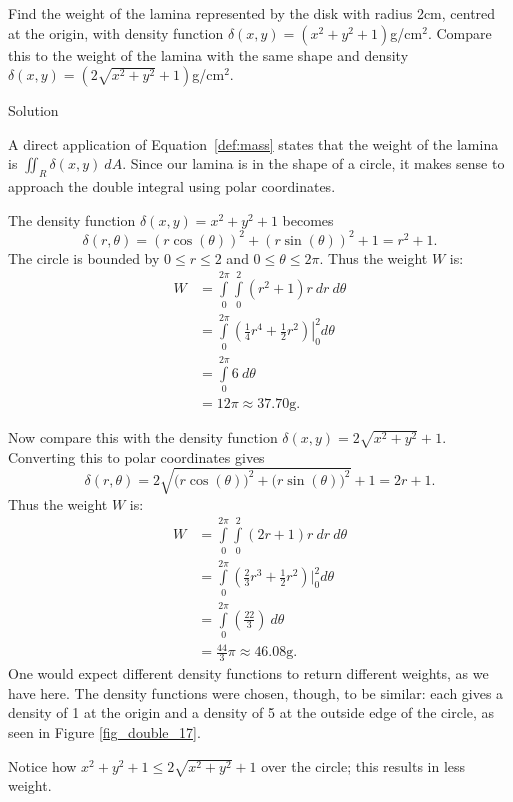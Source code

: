 \begin{example}\label{ex_mass3}
Find the weight of the lamina represented by the disk with radius 2cm, centred at the origin, with density function $\delta(x,y) = (x^2+y^2+1)$g/cm$^2$. Compare this to the weight of the lamina with the same shape and density $\delta(x,y) = (2\sqrt{x^2+y^2}+1)$g/cm$^2$.

Solution 

A direct application of Equation~\eqref{def:mass} states that the weight of the lamina is $\iint_R\delta(x,y)\ dA$. Since our lamina is in the shape of a circle, it makes sense to approach the double integral using polar coordinates.

The density function $\delta(x,y) = x^2+y^2+1$ becomes $$\delta(r,\theta) = (r\cos(\theta))^2+(r\sin(\theta))^2+1 = r^2+1.$$ The circle is bounded by $0\leq r\leq 2$ and $0\leq\theta\leq2\pi$. Thus the weight $W$ is:
\allowdisplaybreaks
\begin{align*}
W &= \int\limits_0^{2\pi}\int\limits_0^2 (r^2+1)r\ dr\ d\theta\\
	&= \int\limits_0^{2\pi} \left.\left(\frac14r^4+\frac12r^2\right)\right|_0^2d\theta\\
	&= \int\limits_0^{2\pi} 6 \ d\theta\\
	&= 12\pi \approx 37.70\text{g}.
\end{align*}

Now compare this with the density function $\delta(x,y) = 2\sqrt{x^2+y^2}+1$. Converting this to polar coordinates gives $$\delta(r,\theta) = 2\sqrt{\Big(r\cos(\theta)\Big)^2+\Big(r\sin(\theta)\Big)^2}+1 = 2r+1.$$ Thus the weight $W$ is:
\begin{align*}
W &= \int\limits_0^{2\pi}\int\limits_0^2 (2r+1)r\ dr\ d\theta\\
	&= \int\limits_0^{2\pi} \left(\frac23r^3+\frac12r^2\right)\Big|_0^2d\theta\\
	&= \int\limits_0^{2\pi} \left(\frac{22}3\right)\ d\theta\\
	&= \frac{44}3\pi \approx 46.08\text{g}.
\end{align*}
One would expect different density functions to return different weights, as we have here. The density functions were chosen, though, to be similar: each gives a density of 1 at the origin and a density of 5 at the outside edge of the circle, as seen in Figure \ref{fig_double_17}.


Notice how $x^2+y^2+1 \leq 2\sqrt{x^2+y^2}+1$ over the circle; this results in less weight.
\end{example}

